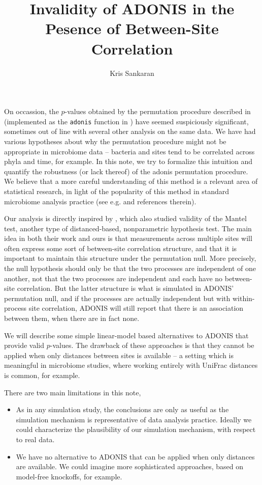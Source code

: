 \documentclass{article}
\title{Invalidity of ADONIS in the Pesence of Between-Site Correlation}
\author{Kris Sankaran}
\begin{document}
On occassion, the $p$-values obtained by the permutation procedure described in
\citep{anderson2001new} (implemented as the \texttt{adonis} function in
\cite{oksanen2007vegan}) have seemed suspiciously significant, sometimes out of
line with several other analysis on the same data. We have had various
hypotheses about why the permutation procedure might not be appropriate in
microbiome data -- bacteria and sites tend to be correlated across phyla and
time, for example. In this note, we try to formalize this intuition and quantify
the robustness (or lack thereof) of the adonis permutation procedure. We believe
that a more careful understanding of this method is a relevant area of
statistical research, in light of the popularity of this method in standard
microbiome analysis practice (see e.g. \cite{fukuyama2012comparisons} and
references therein).

Our analysis is directly inspired by \citep{guillot2013dismantling}, which also
studied validity of the Mantel test, another type of distanced-based,
nonparametric hypothesis test. The main idea in both their work and ours is that
measurements across multiple sites will often express some sort of between-site
correlation structure, and that it is important to maintain this structure under
the permutation null. More precisely, the null hypothesis should only be that
the two processes are independent of one another, not that the two processes are
independent and each have no between-site correlation. But the latter structure
is what is simulated in ADONIS' permutation null, and if the processes are
actually independent but with within-process site correlation, ADONIS will still
report that there is an association between them, when there are in fact none.

We will describe some simple linear-model based alternatives to ADONIS that
provide valid $p$-values. The drawback of these approaches is that they cannot
be applied when only distances between sites is available -- a setting which is
meaningful in microbiome studies, where working entirely with UniFrac distances
\citep{lozupone2005unifrac} is common, for example.

There are two main limitations in this note,

\begin{itemize}
\item As in any simulation study, the conclusions are only as useful as the
  simulation mechanism is representative of data analysis practice. Ideally we
  could characterize the plausibility of our simulation mechanism, with respect
  to real data.
\item We have no alternative to ADONIS that can be applied when only distances
  are available. We could imagine more sophisticated approaches, based on
  model-free knockoffs, for example.
\end{itemize}
\end{document}
